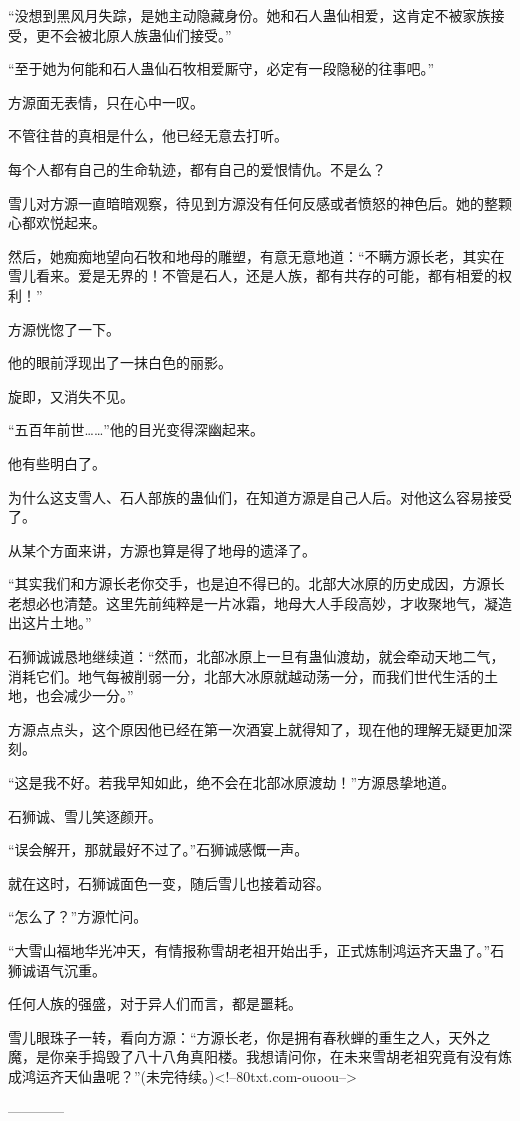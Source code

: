 \begin{this_body}
“没想到黑风月失踪，是她主动隐藏身份。她和石人蛊仙相爱，这肯定不被家族接受，更不会被北原人族蛊仙们接受。”

“至于她为何能和石人蛊仙石牧相爱厮守，必定有一段隐秘的往事吧。”

方源面无表情，只在心中一叹。

不管往昔的真相是什么，他已经无意去打听。

每个人都有自己的生命轨迹，都有自己的爱恨情仇。不是么？

雪儿对方源一直暗暗观察，待见到方源没有任何反感或者愤怒的神色后。她的整颗心都欢悦起来。

然后，她痴痴地望向石牧和地母的雕塑，有意无意地道：“不瞒方源长老，其实在雪儿看来。爱是无界的！不管是石人，还是人族，都有共存的可能，都有相爱的权利！”

方源恍惚了一下。

他的眼前浮现出了一抹白色的丽影。

旋即，又消失不见。

“五百年前世……”他的目光变得深幽起来。

他有些明白了。

为什么这支雪人、石人部族的蛊仙们，在知道方源是自己人后。对他这么容易接受了。

从某个方面来讲，方源也算是得了地母的遗泽了。

“其实我们和方源长老你交手，也是迫不得已的。北部大冰原的历史成因，方源长老想必也清楚。这里先前纯粹是一片冰霜，地母大人手段高妙，才收聚地气，凝造出这片土地。”

石狮诚诚恳地继续道：“然而，北部冰原上一旦有蛊仙渡劫，就会牵动天地二气，消耗它们。地气每被削弱一分，北部大冰原就越动荡一分，而我们世代生活的土地，也会减少一分。”

方源点点头，这个原因他已经在第一次酒宴上就得知了，现在他的理解无疑更加深刻。

“这是我不好。若我早知如此，绝不会在北部冰原渡劫！”方源恳挚地道。

石狮诚、雪儿笑逐颜开。

“误会解开，那就最好不过了。”石狮诚感慨一声。

就在这时，石狮诚面色一变，随后雪儿也接着动容。

“怎么了？”方源忙问。

“大雪山福地华光冲天，有情报称雪胡老祖开始出手，正式炼制鸿运齐天蛊了。”石狮诚语气沉重。

任何人族的强盛，对于异人们而言，都是噩耗。

雪儿眼珠子一转，看向方源：“方源长老，你是拥有春秋蝉的重生之人，天外之魔，是你亲手捣毁了八十八角真阳楼。我想请问你，在未来雪胡老祖究竟有没有炼成鸿运齐天仙蛊呢？”(未完待续。)<!--80txt.com-ouoou-->

------------

\end{this_body}

